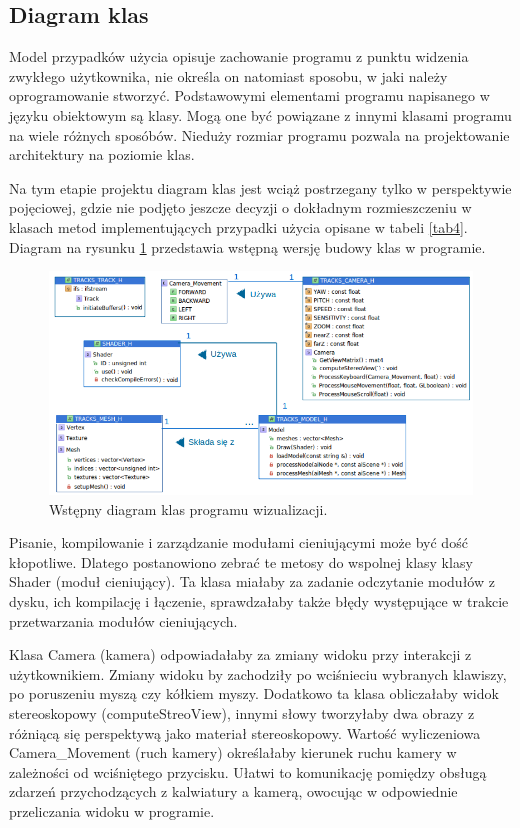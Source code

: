 \subsection{Diagram klas}
Model przypadków użycia opisuje zachowanie programu z punktu widzenia zwykłego użytkownika, nie określa on natomiast sposobu, w jaki
należy oprogramowanie stworzyć. Podstawowymi elementami programu napisanego w języku obiektowym są klasy. Mogą one być powiązane z innymi klasami programu na wiele różnych sposóbów. Nieduży rozmiar programu pozwala na projektowanie architektury na poziomie klas.

Na tym etapie projektu diagram klas jest wciąż postrzegany tylko w perspektywie pojęciowej, gdzie nie podjęto jeszcze decyzji o dokładnym rozmieszczeniu w klasach metod implementujących przypadki użycia opisane w tabeli \ref{tab4}. Diagram na rysunku \ref{rys24} przedstawia wstępną wersję budowy klas w programie. 

\begin{figure}[H]
		\centering
 		\includegraphics[width=15.5cm]{diagramKlas.png}
    	\caption{Wstępny diagram klas programu wizualizacji.}
 		\label{rys24}
\end{figure}

Pisanie, kompilowanie i zarządzanie modułami cieniującymi może być dość kłopotliwe. Dlatego postanowiono zebrać te metosy do wspolnej klasy klasy Shader (moduł cieniujący). Ta klasa miałaby za zadanie odczytanie modułów z dysku, ich kompilację i łączenie, sprawdzałaby także błędy występujące w trakcie przetwarzania modułów cieniujących.

Klasa Camera (kamera) odpowiadałaby za zmiany widoku przy interakcji z użytkownikiem. Zmiany widoku by zachodziły po wciśnieciu wybranych klawiszy, po poruszeniu myszą czy kółkiem myszy. Dodatkowo ta klasa obliczałaby widok stereoskopowy (computeStreoView), innymi słowy tworzyłaby dwa obrazy z różniącą się perspektywą jako materiał stereoskopowy. Wartość wyliczeniowa Camera\_Movement (ruch kamery) określałaby kierunek ruchu kamery w zależności od wciśniętego przycisku. Ułatwi to komunikację pomiędzy obsługą zdarzeń przychodzących z kalwiatury a kamerą, owocując w odpowiednie przeliczania widoku w programie. 

